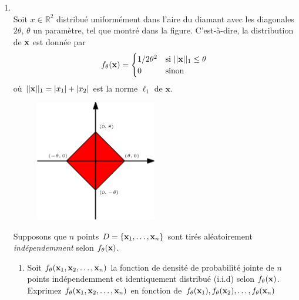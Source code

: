 \documentclass[11pt,french,english]{article}
\begin{document}
\begin{enumerate}
\begin{enumerate}
\end{enumerate}

\item \textbf{}
\\

{Soit $x\in \mathbb{R}^2$ distribué uniformément dans l'aire du diamant avec les diagonales $2\theta$, $\theta$ un paramètre, tel que montré dans la figure. C'est-à-dire, la distribution de $\mathbf{x}$ est donnée par
$$
f_\theta(\mathbf{x}) = \begin{cases}
1/2\theta^2&\text{si } ||\mathbf{x}||_1 \leq \theta\\
0&\text{sinon}
\end{cases}
$$
où $||\mathbf{x}||_1 = |x_1| + |x_2|$ est la norme $\ell_1$ de $\mathbf{x}$.
}

\begin{figure}[ht]
\centering
\includegraphics[width = 0.5\textwidth]{diamond.eps}
\end{figure}

{Supposons que $n$ points $D=\{ \mathbf{x}_1, \dots, \mathbf{x}_n\}$ sont tirés aléatoirement \emph{indépendemment} selon $f_\theta(\mathbf{x})$.}

\begin{enumerate}

\item {}
{Soit $f_\theta(\mathbf{x}_1, \mathbf{x}_2, \ldots, \mathbf{x}_n)$ la fonction de densité de probabilité jointe de $n$ points indépendemment et identiquement distribué (i.i.d) selon $f_\theta(\mathbf{x})$.
Exprimez $f_\theta(\mathbf{x}_1, \mathbf{x}_2, \ldots, \mathbf{x}_n)$ en fonction de $f_\theta(\mathbf{x}_1), f_\theta(\mathbf{x}_2), \ldots, f_\theta(\mathbf{x}_n)$}


\end{enumerate}
\end{enumerate}
\end{document}
